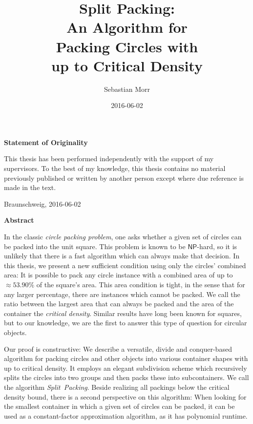 \documentclass[a4paper,style=print,bibliography=totoc,nexus,lnum,extramargin]{tubsbook}
\title{Split Packing:\\ An Algorithm for\\ Packing Circles with\\ up to Critical Density}
\author{\sffamily\LARGE Sebastian Morr}
\date{\large 2016-06-02}
\begin{document}
\frontmatter

\maketitle

\thispagestyle{plain}
\cleardoublepage

\vspace*{7cm}
\centerline{\bfseries Statement of Originality}
\vspace*{1em}
\noindent
This thesis has been performed independently with the support of my supervisors.
To the best of my knowledge, this thesis contains no material previously
published or written by another person except where due reference is made in the text.

\par
  \bigskip\noindent Braunschweig, 2016-06-02 \par
  \vspace*{10mm}
  \hfill\hrulefill
\cleardoublepage

\thispagestyle{plain}
\centerline{\bfseries Abstract}
\vspace*{1em}
\noindent

In the classic \emph{circle packing problem}, one asks whether a given set of circles can be packed into the unit square. This problem is known to be $\mathsf{NP}$-hard, so it is unlikely that there is a fast algorithm which can always make that decision.
In this thesis, we present a new sufficient condition using only the circles' combined area: It is possible to pack any circle instance with a combined area of up to $\approx \! 53.90\%$ of the square's area. This area condition is tight, in the sense that for any larger percentage, there are instances which cannot be packed. We call the ratio between the largest area that can always be packed and the area of the container the \emph{critical density}. Similar results have long been known for squares, but to our knowledge, we are the first to answer this type of question for circular objects.

Our proof is constructive: We describe a versatile, divide and conquer-based algorithm for packing circles and other objects into various container shapes with up to critical density. It employs an elegant subdivision scheme which recursively splits the circles into two groups and then packs these into subcontainers. We call the algorithm \emph{Split~Packing}.
Beside realizing all packings below the critical density bound, there is a second perspective on this algorithm: When looking for the smallest container in which a given set of circles can be packed, it can be used as a constant-factor approximation algorithm, as it has polynomial runtime.
\end{document}
